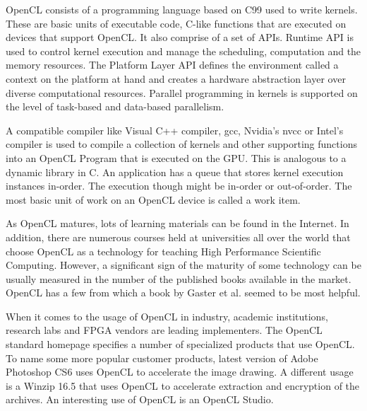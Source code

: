 OpenCL consists of a programming language based on C99 used to write kernels. These are basic units of executable code, C-like functions that are executed on devices that support OpenCL. It also comprise of a set of APIs. Runtime API is used to control kernel execution and manage the scheduling, computation and the memory resources. The Platform Layer API defines the environment called a context on the platform at hand and creates a hardware abstraction layer over diverse computational resources. Parallel programming in kernels is supported on the level of task-based and data-based parallelism.

A compatible compiler like Visual C++ compiler, gcc, Nvidia's nvcc or Intel's compiler is used to compile a collection of kernels and other supporting functions into an OpenCL Program that is executed on the GPU. This is analogous to a dynamic library in C. An application has a queue that stores kernel execution instances in-order. The execution though might be in-order or out-of-order. The most basic unit of work on an OpenCL device is called a work item.

As OpenCL matures, lots of learning materials can be found in the Internet. In addition, there are numerous courses held at universities all over the world that choose OpenCL as a technology for teaching High Performance Scientific Computing. However, a significant sign of the maturity of some technology can be usually measured in the number of the published books available in the market. OpenCL has a few from which a book by Gaster et al. \cite{gaster2011heterogeneous} seemed to be most helpful.

When it comes to the usage of OpenCL in industry, academic institutions, research labs and FPGA vendors are leading implementers. The OpenCL standard homepage\cite{khronos_opencl} specifies a number of specialized products that use OpenCL. To name some more popular customer products, latest version of Adobe Photoshop CS6 uses OpenCL to accelerate the image drawing. A different usage is a Winzip 16.5 that uses OpenCL to accelerate extraction and encryption of the archives. An interesting use of OpenCL is an OpenCL Studio.






